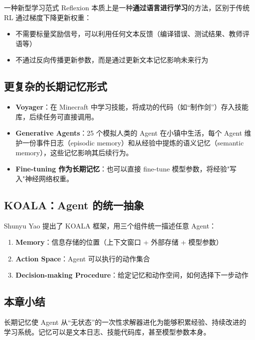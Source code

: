 \documentclass[a4paper]{article}
\begin{document}
\begin{knowledgebox}{一种新型学习范式}
Reflexion 本质上是一种\textbf{通过语言进行学习}的方法，区别于传统 RL 通过梯度下降更新权重：
\begin{itemize}
    \item 不需要标量奖励信号，可以利用任何文本反馈（编译错误、测试结果、教师评语等）
    \item 不通过反向传播更新参数，而是通过更新文本记忆影响未来行为
\end{itemize}
\end{knowledgebox}

\subsection{更复杂的长期记忆形式}

\begin{itemize}
    \item \textbf{Voyager}：在 Minecraft 中学习技能，将成功的代码（如``制作剑''）存入技能库，后续任务可直接调用。
    \item \textbf{Generative Agents}：25 个模拟人类的 Agent 在小镇中生活，每个 Agent 维护一份事件日志（episodic memory）和从经验中提炼的语义记忆（semantic memory），这些记忆影响其后续行为。
    \item \textbf{Fine-tuning 作为长期记忆}：也可以直接 fine-tune 模型参数，将经验"写入"神经网络权重。
\end{itemize}

\subsection{KOALA：Agent 的统一抽象}

Shunyu Yao 提出了 KOALA 框架，用三个组件统一描述任意 Agent：

\begin{enumerate}
    \item \textbf{Memory}：信息存储的位置（上下文窗口 + 外部存储 + 模型参数）
    \item \textbf{Action Space}：Agent 可以执行的动作集合
    \item \textbf{Decision-making Procedure}：给定记忆和动作空间，如何选择下一步动作
\end{enumerate}

\subsection{本章小结}

长期记忆使 Agent 从``无状态''的一次性求解器进化为能够积累经验、持续改进的学习系统。记忆可以是文本日志、技能代码库，甚至模型参数本身。
\end{document}
